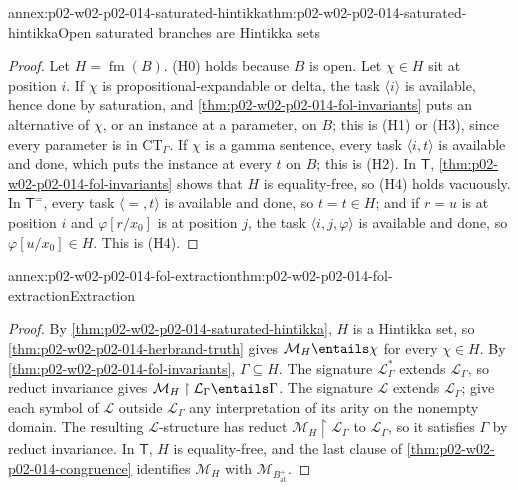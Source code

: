 \begin{annexitem}{annex:p02-w02-p02-014-saturated-hintikka}{thm:p02-w02-p02-014-saturated-hintikka}{Open saturated branches are Hintikka sets}
\begin{proof}
Let \(H=\operatorname{fm}(B)\).  (H0) holds because \(B\) is open.  Let \(\chi\in H\) sit
at position \(i\).  If \(\chi\) is propositional-expandable or delta, the task
\(\langle i\rangle\) is available, hence done by saturation, and
\cref{thm:p02-w02-p02-014-fol-invariants} puts an alternative of \(\chi\),
or an instance at a parameter, on \(B\); this is (H1) or (H3), since every
parameter is in \(\mathrm{CT}_{\Gamma}\).  If \(\chi\) is a gamma sentence,
every task \(\langle i,t\rangle\) is available and done, which puts the
instance at every \(t\) on \(B\); this is (H2).  In \(\mathsf T\),
\cref{thm:p02-w02-p02-014-fol-invariants} shows that \(H\) is equality-free,
so (H4) holds vacuously.  In \(\mathsf T^{=}\), every task
\(\langle{=},t\rangle\) is available and done, so \(t=t\in H\); and if
\(r=u\) is at position \(i\) and \(\varphi[r/x_0]\) is at position \(j\), the
task \(\langle i,j,\varphi\rangle\) is available and done, so
\(\varphi[u/x_0]\in H\).  This is (H4).
\end{proof}
\end{annexitem}

\begin{annexitem}{annex:p02-w02-p02-014-fol-extraction}{thm:p02-w02-p02-014-fol-extraction}{Extraction}
\begin{proof}
By \cref{thm:p02-w02-p02-014-saturated-hintikka}, \(H\) is a Hintikka set,
so \cref{thm:p02-w02-p02-014-herbrand-truth} gives \(\mathcal M_H\entails\chi\)
for every \(\chi\in H\).  By \cref{thm:p02-w02-p02-014-fol-invariants},
\(\Gamma\subseteq H\).  The signature \(\mathcal L_{\Gamma}^{*}\) extends
\(\mathcal L_{\Gamma}\), so reduct invariance gives
\(\mathcal M_H\restriction\mathcal L_{\Gamma}\entails\Gamma\).  The signature
\(\mathcal L\) extends \(\mathcal L_{\Gamma}\); give each symbol of
\(\mathcal L\) outside \(\mathcal L_{\Gamma}\) any interpretation of its
arity on the nonempty domain.  The resulting \(\mathcal L\)-structure has
reduct \(\mathcal M_H\restriction\mathcal L_{\Gamma}\) to \(\mathcal
L_{\Gamma}\), so it satisfies \(\Gamma\) by reduct invariance.  In
\(\mathsf T\), \(H\) is equality-free, and the last clause of
\cref{thm:p02-w02-p02-014-congruence} identifies \(\mathcal M_H\) with
\(\mathcal M_{B^{+}_{\mathrm{at}}}\).
\end{proof}
\end{annexitem}

